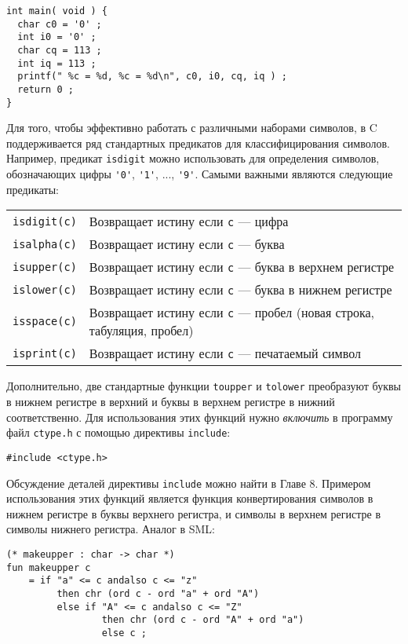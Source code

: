 \begin{lstlisting}
int main( void ) {
  char c0 = '0' ;
  int i0 = '0' ;
  char cq = 113 ;
  int iq = 113 ;
  printf(" %c = %d, %c = %d\n", c0, i0, cq, iq ) ;
  return 0 ;
}
\end{lstlisting}

Для того, чтобы эффективно работать с различными наборами символов, в C поддерживается ряд стандартных предикатов для классифицирования символов. Например, предикат \lstinline|isdigit| можно использовать для определения символов, обозначающих цифры \lstinline|'0'|, \lstinline|'1'|, ..., \lstinline|'9'|. Самыми важными являются следующие предикаты:

\begin{tabular}{lp{10cm}}
\lstinline|isdigit(c)| & Возвращает истину если \lstinline|c| --- цифра \\
\lstinline|isalpha(c)| & Возвращает истину если \lstinline|c| --- буква \\
\lstinline|isupper(c)| & Возвращает истину если \lstinline|c| --- буква в верхнем регистре \\
\lstinline|islower(c)| & Возвращает истину если \lstinline|c| --- буква в нижнем регистре \\
\lstinline|isspace(c)| & Возвращает истину если \lstinline|c| --- пробел (новая строка, табуляция, пробел) \\
\lstinline|isprint(c)| & Возвращает истину если \lstinline|c| --- печатаемый символ \\
\end{tabular}

Дополнительно, две стандартные функции \lstinline|toupper| и \lstinline|tolower| преобразуют буквы в нижнем регистре в верхний и буквы в верхнем регистре в нижний соответственно. Для использования этих функций нужно \emph{включить} в программу файл \lstinline|ctype.h| с помощью директивы \lstinline|include|:

\begin{lstlisting}
#include <ctype.h>
\end{lstlisting}

Обсуждение деталей директивы \lstinline|include| можно найти в Главе 8. Примером использования этих функций является функция конвертирования символов в нижнем регистре в буквы верхнего регистра, и символы в верхнем регистре в символы нижнего регистра. Аналог в SML:

\begin{lstlisting}[style=customml]
(* makeupper : char -> char *)
fun makeupper c
    = if "a" <= c andalso c <= "z"
         then chr (ord c - ord "a" + ord "A")
         else if "A" <= c andalso c <= "Z"
                 then chr (ord c - ord "A" + ord "a")
                 else c ;
\end{lstlisting}

